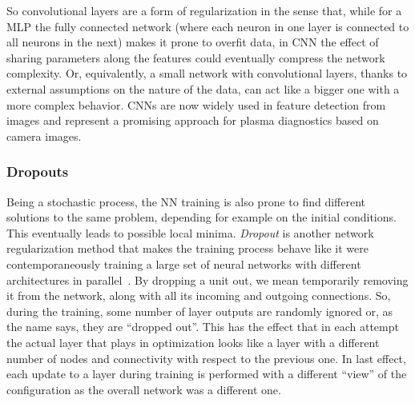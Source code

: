 So convolutional layers are a form of regularization in the sense that, while for a \ac{MLP} the fully connected network (where each neuron in one layer is connected to all neurons in the next) makes it prone to overfit data, in \ac{CNN} the effect of sharing parameters along the features could eventually compress the network complexity. Or, equivalently, a small network with convolutional layers, thanks to external assumptions on the nature of the data, can act like a bigger one with a more complex behavior. CNNs are now widely used in feature detection from images and represent a promising approach for plasma diagnostics based on camera images.%
%

\subsubsection{Dropouts}
Being a stochastic process, the NN training is also prone to find different solutions to the same problem, depending for example on the initial conditions. This eventually leads to possible local minima. 
\textit{Dropout} is another network regularization method that makes the training process behave like it were contemporaneously training a large set of neural networks with different architectures in parallel~\cite{Srivastava:2014:DSW:2627435.2670313}.
By dropping a unit out, we mean temporarily removing it from the network, along with all its incoming and outgoing connections.
So, during the training, some number of layer outputs are randomly ignored or, as the name says, they are “dropped out”. This has the effect that in each attempt the actual layer that plays in optimization looks like a layer with a different number of nodes and connectivity with respect to the previous one. In last effect, each update to a layer during training is performed with a different “view” of the configuration as the overall network was a different one.


